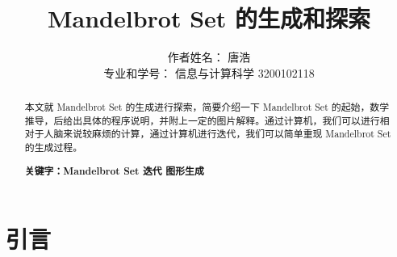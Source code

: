 \documentclass{ctexart}
\title{Mandelbrot Set 的生成和探索}
\author{作者姓名： 唐浩 \\ 专业和学号： 信息与计算科学 3200102118}
\begin{document}
\maketitle

\renewcommand{\abstractname}{摘要} %


\begin{abstract}

  本文就 Mandelbrot Set \cite{1989The} 的生成进行探索，简要介绍一下 Mandelbrot Set 的起始，数学推导，后给出具体的程序说明，并附上一定的图片解释。通过计算机，我们可以进行相对于人脑来说较麻烦的计算，通过计算机进行迭代，我们可以简单重现 Mandelbrot Set 的生成过程。
  
\textbf{关键字：Mandelbrot Set 迭代 图形生成}

\end{abstract}

\section{引言} %
\end{document}
